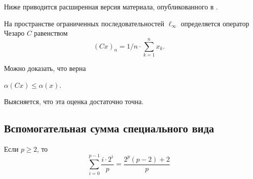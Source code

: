 Ниже приводится расширенная версия материала, опубликованного в
\cite{our-vzms-2018}.

На пространстве ограниченных последовательностей $\ell_\infty$ определяется оператор Чезаро $C$
равенством
\begin{equation}
	(Cx)_n = {1}/{n} \cdot \sum_{k=1}^n x_k
	.
\end{equation}

Можно доказать, что верна
\begin{theorem}
	\label{thm:alpha_Cx_leq_alpha_x}
	$\alpha(Cx) \leqslant \alpha(x)$.
\end{theorem}
Выясняется, что эта оценка достаточно точна.

\subsection{Вспомогательная сумма специального вида}
\begin{lemma}
	Если $p\geq 2$, то
	\begin{equation}\label{summa_drobey}
		\sum_{i=0}^{p-1} \frac{i \cdot 2^i}{p} = \frac{2^p(p-2) + 2}{p}
	\end{equation}
\end{lemma}


